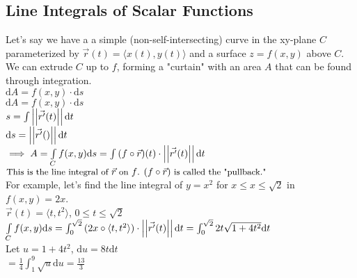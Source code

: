 \subsection{Line Integrals of Scalar Functions}
\noindent
Let's say we have a a simple (non-self-intersecting) curve in the xy-plane $C$ parameterized by $\vec{r}(t)=\langle x(t),y(t)\rangle$ and a surface $z=f(x,y)$ above $C$. We can extrude $C$ up to $f$, forming a "curtain" with an area $A$ that can be found through integration.\\
\indent
$\mathrm{d}A=f(x,y)\cdot\mathrm{d}s$\\
\indent
$\mathrm{d}A=f(x,y)\cdot\mathrm{d}s$\\
\indent
$s=\int{\left|\left|\vec{r^\prime}(t)\right|\right|\mathrm{d}t}$\\
\indent
$\mathrm{d}s=\left|\left|\vec{r^\prime}()\right|\right|\mathrm{d}t$\\
\indent
$\implies A=\int\limits_{C}{f(x,y)\mathrm{d}s}=\int{(f\circ\vec{r})(t)\cdot\left|\left|\vec{r^\prime}(t)\right|\right|\mathrm{d}t}$\\
\indent
$\small{\text{This is the line integral of }\vec{r}\text{ on }f\text{. }(f\circ\vec{r})\text{ is called the "pullback."}}$\\

\noindent
For example, let's find the line integral of $y=x^2$ for $x\leq x\leq\sqrt{2}$ in $f(x,y)=2x$.\\
\indent
$\vec{r}(t)=\langle t,t^2\rangle$, $0\leq t\leq\sqrt{2}$\\
\indent
$\int\limits_{C}{f(x,y)\mathrm{d}s}=\int_{0}^{\sqrt{2}}{(2x\circ\langle t,t^2\rangle)\cdot\left|\left|\vec{r^\prime}(t)\right|\right|\mathrm{d}t}=\int_{0}^{\sqrt{2}}{2t\sqrt{1+4t^2}\mathrm{d}t}$\\
\indent
Let $u=1+4t^2$, $\mathrm{d}u=8t\mathrm{d}t$\\
\indent
$=\frac{1}{4}\int_{1}^{9}{\sqrt{u}\mathrm{d}u}=\frac{13}{3}$\\